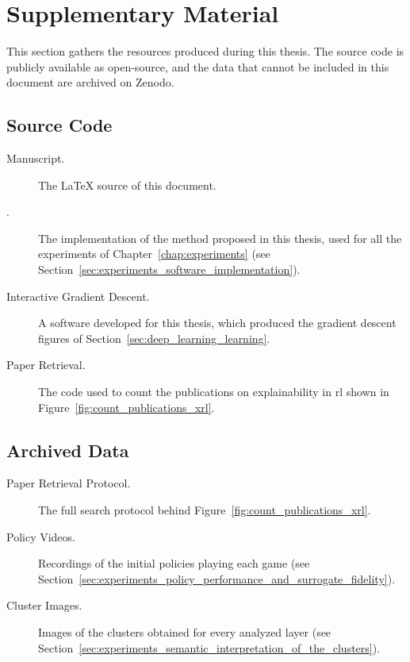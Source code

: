 \chapter*{Supplementary Material}
\label{chap:supplementary_material}

This section gathers the resources produced during this thesis.
The source code is publicly available as open-source, and the data that cannot be included in this document are archived on Zenodo.

\section*{Source Code}

\begin{description}
  \item[Manuscript.] The \LaTeX{} source of this document. \\
  \LinkManuscriptRepository

  \item[.] The implementation of the method proposed in this thesis, used for all the experiments of Chapter~\ref{chap:experiments} (see Section~\ref{sec:experiments_software_implementation}). \\
  \LinkCarRepository

  \item[Interactive Gradient Descent.] A software developed for this thesis, which produced the gradient descent figures of Section~\ref{sec:deep_learning_learning}. \\
  \LinkInteractiveGradientDescent

  \item[Paper Retrieval.] The code used to count the publications on explainability in \gls{rl} shown in Figure~\ref{fig:count_publications_xrl}. \\
  \LinkPaperRetrievalRepository
\end{description}

\section*{Archived Data}

\begin{description}
  \item[Paper Retrieval Protocol.] The full search protocol behind Figure~\ref{fig:count_publications_xrl}. \\
  \LinkPaperRetrievalProtocol

  \item[Policy Videos.] Recordings of the initial policies playing each game (see Section~\ref{sec:experiments_policy_performance_and_surrogate_fidelity}). \\
  \LinkPolicyVideos

  \item[Cluster Images.] Images of the clusters obtained for every analyzed layer (see Section~\ref{sec:experiments_semantic_interpretation_of_the_clusters}). \\
  \LinkClusterImages
\end{description}
